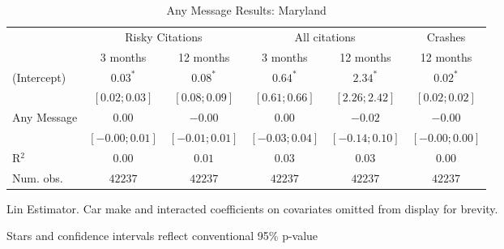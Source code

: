 
\begin{table}
\caption{Any Message Results: Maryland}
\begin{center}
\begin{threeparttable}
\begin{tabular}{l c c c c c}
\hline
 & \multicolumn{2}{c}{Risky Citations} & \multicolumn{2}{c}{All citations} & \multicolumn{1}{c}{Crashes} \\
\cline{2-3} \cline{4-5} \cline{6-6}
 & 3 months & 12 months & 3 months & 12 months & 12 months \\
\hline
(Intercept) & $0.03^{*}$       & $0.08^{*}$       & $0.64^{*}$       & $2.34^{*}$       & $0.02^{*}$       \\
            & $ [ 0.02; 0.03]$ & $ [ 0.08; 0.09]$ & $ [ 0.61; 0.66]$ & $ [ 2.26; 2.42]$ & $ [ 0.02; 0.02]$ \\
Any Message & $0.00$           & $-0.00$          & $0.00$           & $-0.02$          & $-0.00$          \\
            & $ [-0.00; 0.01]$ & $ [-0.01; 0.01]$ & $ [-0.03; 0.04]$ & $ [-0.14; 0.10]$ & $ [-0.00; 0.00]$ \\
\hline
R$^2$       & $0.00$           & $0.01$           & $0.03$           & $0.03$           & $0.00$           \\
Num. obs.   & $42237$          & $42237$          & $42237$          & $42237$          & $42237$          \\
\hline
\end{tabular}
\begin{tablenotes}[flushleft]
\scriptsize{\item Lin Estimator. Car make and interacted coefficients on covariates omitted from display for brevity.
                             \item Stars and confidence intervals reflect conventional 95\% p-value}
\end{tablenotes}
\end{threeparttable}
\label{table:coefficients}
\end{center}
\end{table}
